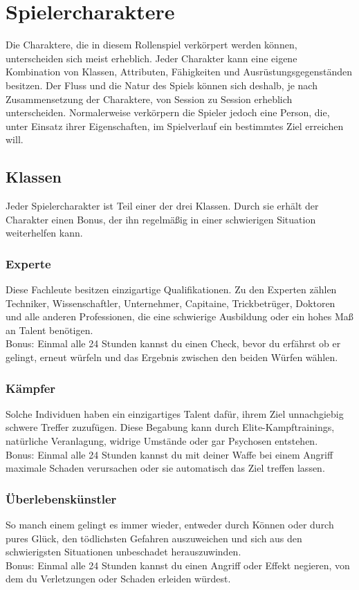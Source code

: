 \chapter{Spielercharaktere}
Die Charaktere, die in diesem Rollenspiel verkörpert werden können, unterscheiden sich meist erheblich. Jeder Charakter kann eine eigene Kombination von Klassen, Attributen, Fähigkeiten und Ausrüstungsgegenständen besitzen. Der Fluss und die Natur des Spiels können sich deshalb, je nach Zusammensetzung der Charaktere, von Session zu Session erheblich unterscheiden. Normalerweise verkörpern die Spieler jedoch eine Person, die, unter Einsatz ihrer Eigenschaften, im Spielverlauf ein bestimmtes Ziel erreichen will.
\section{Klassen}
Jeder Spielercharakter ist Teil einer der drei Klassen. Durch sie erhält der Charakter einen Bonus, der ihn regelmäßig in einer schwierigen Situation weiterhelfen kann.
\subsection*{Experte}
Diese \glqq Fachleute\grqq{} besitzen einzigartige Qualifikationen. Zu den Experten zählen Techniker, Wissenschaftler, Unternehmer, Capitaine, Trickbetrüger, Doktoren und alle anderen Professionen, die eine schwierige Ausbildung oder ein hohes Maß an Talent benötigen.\\
Bonus: Einmal alle 24 Stunden kannst du einen Check, bevor du erfährst ob er gelingt, erneut würfeln und das Ergebnis zwischen den beiden Würfen wählen.
\subsection*{Kämpfer}
Solche Individuen haben ein einzigartiges Talent dafür, ihrem Ziel unnachgiebig schwere Treffer zuzufügen. Diese Begabung kann durch Elite-Kampftrainings, natürliche Veranlagung, widrige Umstände oder gar Psychosen entstehen.\\
Bonus: Einmal alle 24 Stunden kannst du mit deiner Waffe bei einem Angriff maximale Schaden verursachen oder sie automatisch das Ziel treffen lassen.
\subsection*{Überlebenskünstler}
So manch einem gelingt es immer wieder, entweder durch Können oder durch pures Glück, den tödlichsten Gefahren auszuweichen und sich aus den schwierigsten Situationen unbeschadet herauszuwinden.\\
Bonus: Einmal alle 24 Stunden kannst du einen Angriff oder Effekt negieren, von dem du Verletzungen oder Schaden erleiden würdest.\\

